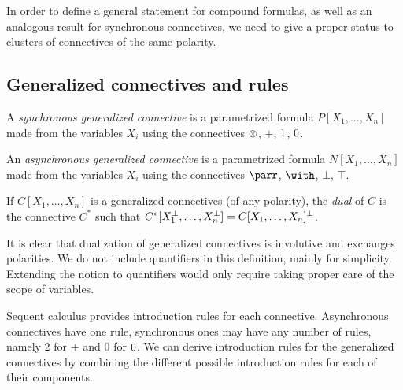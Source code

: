 In order to define a general statement for compound formulas, as well as
an analogous result for synchronous connectives, we need to give a proper
status to clusters of connectives of the same polarity.

\subsection{Generalized connectives and rules}\label{generalized-connectives-and-rules}

\begin{definition}
A \emph{synchronous generalized connective} is a parametrized formula
$P[X_1,\ldots,X_n]$ made from the variables $X_i$ using the connectives
$\otimes$, $\plus$, $1$, $0$.

An \emph{asynchronous generalized connective} is a parametrized formula
$N[X_1,\ldots,X_n]$ made from the variables $X_i$ using the connectives
$\parr$, $\with$, $\bot$, $\top$.

If $C[X_1,\ldots,X_n]$ is a generalized connectives (of any polarity), the
\emph{dual} of $C$ is the connective $C^*$ such that
$C^*[X_1^\bot,\ldots,X_n^\bot]=C[X_1,\ldots,X_n]^\bot$.
\end{definition}

It is clear that dualization of generalized connectives is involutive
and exchanges polarities. We do not include quantifiers in this
definition, mainly for simplicity. Extending the notion to quantifiers
would only require taking proper care of the scope of variables.

Sequent calculus provides introduction rules for each connective.
Asynchronous connectives have one rule, synchronous ones may have any number of
rules, namely 2 for \(\plus\) and 0 for \(0\). We can derive
introduction rules for the generalized connectives by combining the
different possible introduction rules for each of their components.

